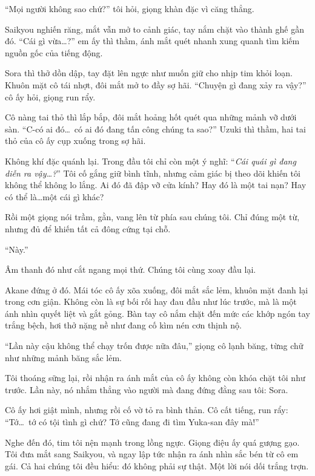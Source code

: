 \documentclass[../main.tex]{subfiles}
\begin{document}
``Mọi người không sao chứ?'' tôi hỏi, giọng khàn đặc vì căng thẳng.

Saikyou nghiến răng, mắt vẫn mở to cảnh giác, tay nắm chặt vào thành ghế gần đó. ``Cái gì vừa\dots?'' em ấy thì thầm, ánh mắt quét nhanh xung quanh tìm kiếm nguồn gốc của tiếng động.

Sora thì thở dồn dập, tay đặt lên ngực như muốn giữ cho nhịp tim khỏi loạn. Khuôn mặt cô tái nhợt, đôi mắt mở to đầy sợ hãi. ``Chuyện gì đang xảy ra vậy?'' cô ấy hỏi, giọng run rẩy.

Cô nàng tai thỏ thì lắp bắp, đôi mắt hoảng hốt quét qua những mảnh vỡ dưới sàn. ``C-có ai đó\dots\ có ai đó đang tấn công chúng ta sao?'' Uzuki thì thầm, hai tai thỏ của cô ấy cụp xuống trong sợ hãi.

Không khí đặc quánh lại. Trong đầu tôi chỉ còn một ý nghĩ: ``\textit{Cái quái gì đang diễn ra vậy\dots?}'' Tôi cố gắng giữ bình tĩnh, nhưng cảm giác bị theo dõi khiến tôi không thể không lo lắng. Ai đó đã đập vỡ cửa kính? Hay đó là một tai nạn? Hay có thể là\dots một cái gì khác?

Rồi một giọng nói trầm, gằn, vang lên từ phía sau chúng tôi. Chỉ đúng một từ, nhưng đủ để khiến tất cả đông cứng tại chỗ.

``Này.''

Âm thanh đó như cắt ngang mọi thứ. Chúng tôi cùng xoay đầu lại.

Akane đứng ở đó. Mái tóc cô ấy xõa xuống, đôi mắt sắc lẻm, khuôn mặt đanh lại trong cơn giận. Không còn là sự bối rối hay đau đầu như lúc trước, mà là một ánh nhìn quyết liệt và gắt gỏng. Bàn tay cô nắm chặt đến mức các khớp ngón tay trắng bệch, hơi thở nặng nề như đang cố kìm nén cơn thịnh nộ.


``Lần này cậu không thể chạy trốn được nữa đâu,'' giọng cô lạnh băng, từng chữ như những mảnh băng sắc lẻm.

Tôi thoáng sững lại, rồi nhận ra ánh mắt của cô ấy không còn khóa chặt tôi như trước. Lần này, nó nhắm thẳng vào người mà đang đứng đằng sau tôi: Sora.

Cô ấy hơi giật mình, nhưng rồi cố vờ tỏ ra bình thản. Cô cất tiếng, run rẩy: ``Tớ\dots\ tớ có tội tình gì chứ? Tớ cũng đang đi tìm Yuka-san đây mà!''

Nghe đến đó, tim tôi nện mạnh trong lồng ngực. Giọng điệu ấy quá gượng gạo. Tôi đưa mắt sang Saikyou, và ngay lập tức nhận ra ánh nhìn sắc bén từ cô em gái. Cả hai chúng tôi đều hiểu: đó không phải sự thật. Một lời nói dối trắng trợn.
\end{document}
